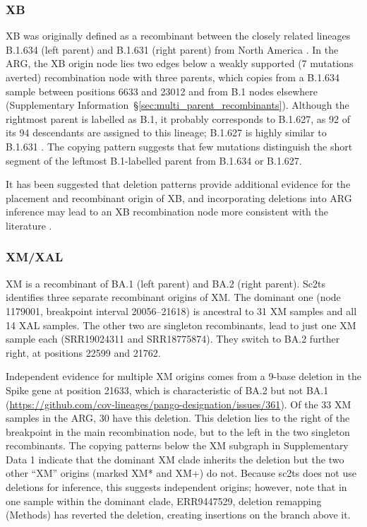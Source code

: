 \documentclass[12pt]{article}
\newcommand{\supref}[1]{Supplementary Information~\S\ref{#1}}
\begin{document}
\subsubsection{XB}
\label{sec:dd_xb}

XB was originally defined as a recombinant between
the closely related lineages B.1.634 (left parent) and B.1.631 (right parent)
from North America \cite{Gutierrez2022}.
In the ARG, the XB origin node lies two edges below a weakly supported
(7 mutations averted) recombination node with three parents,
which copies from a B.1.634 sample between positions 6633 and 23012
and from B.1 nodes elsewhere (\supref{sec:multi_parent_recombinants}).
Although the rightmost parent is labelled as B.1,
it probably corresponds to B.1.627,
as 92 of its 94 descendants are assigned to this lineage;
B.1.627 is highly similar to B.1.631 \cite{Gutierrez2022}.
The copying pattern suggests that
few mutations distinguish the short segment
of the leftmost B.1-labelled parent from B.1.634 or B.1.627.

It has been suggested that deletion patterns provide additional
evidence for the placement and recombinant origin of XB, and
incorporating deletions
into ARG inference may lead to an XB recombination node more
consistent with the literature \cite{Gutierrez2022}.

\subsubsection{XM/XAL}
\label{sec:dd_xm}

XM is a recombinant of BA.1 (left parent) and BA.2 (right parent).
Sc2ts identifies three separate recombinant origins of XM.
The dominant one (node 1179001, breakpoint interval 20056--21618)
is ancestral to 31 XM samples and all 14 XAL samples.
The other two are singleton recombinants, lead to just one XM sample
each (SRR19024311 and SRR18775874).
They switch to BA.2 further right, at positions 22599 and 21762.

Independent evidence for multiple XM origins
comes from a 9-base deletion
in the Spike gene at position 21633,
which is characteristic of BA.2 but not BA.1
(\url{https://github.com/cov-lineages/pango-designation/issues/361}).
Of the 33 XM samples in the ARG, 30 have this deletion.
This deletion lies to the right of the breakpoint in the main recombination node,
but to the left in the two singleton recombinants.
The copying patterns below the XM subgraph in Supplementary Data 1
indicate that the dominant XM clade inherits the deletion
but the two other ``XM'' origins (marked XM* and XM+) do not.
Because sc2ts does not use deletions for inference,
this suggests independent origins; however, note that in one
sample within the dominant clade, ERR9447529, deletion remapping (Methods)
has reverted the deletion, creating insertions on the branch above it.
\end{document}
